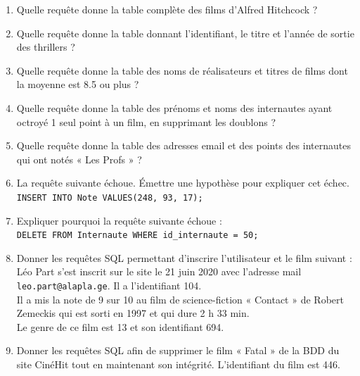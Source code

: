 \documentclass[a4paper,12pt]{article}
\begin{document}
\begin{enumerate}[\bfseries 1.]
\item  Quelle requête donne la table complète des films d'Alfred Hitchcock ?\\

\item  Quelle requête donne la table donnant l'identifiant, le titre et l'année de sortie des thrillers ?\\

\newpage
\item  Quelle requête donne la table des noms de réalisateurs et titres de films dont la moyenne est 8.5 ou plus ?\\


\item  Quelle requête donne la table des prénoms et noms des internautes ayant octroyé 1 seul point à un film,
en supprimant les doublons ?\\


\item Quelle requête donne la table des adresses email et des points des internautes qui ont notés « Les Profs » ?\\


\item La requête suivante échoue. Émettre une hypothèse pour expliquer cet échec.\\
\texttt{INSERT INTO Note VALUES(248, 93, 17);}\\


\item Expliquer pourquoi la requête suivante échoue :\\
\texttt{DELETE FROM Internaute WHERE id_internaute = 50;}\\


\item Donner les requêtes SQL permettant d'inscrire l'utilisateur et le film suivant :\\
Léo Part s'est inscrit sur le site le 21 juin 2020 avec l'adresse mail \texttt{leo.part@alapla.ge}. Il a l'identifiant 104.\\
Il a mis la note de 9 sur 10 au film de science-fiction « Contact » de Robert Zemeckis qui est sorti en 1997 et qui dure 2 h 33 min.\\
Le genre de ce film est 13 et son identifiant 694.\\


\item Donner les requêtes SQL afin de supprimer le film « Fatal » de la BDD du site CinéHit tout en maintenant son intégrité. L'identifiant du film est 446.\\

\end{enumerate}
\end{document}
